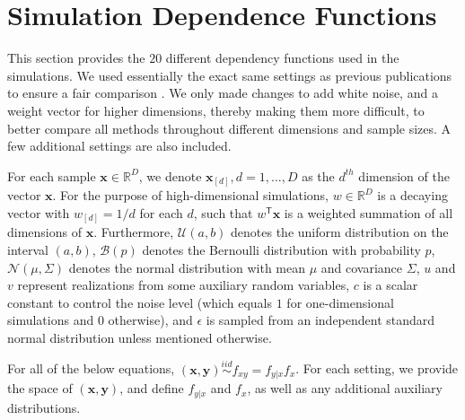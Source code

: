\documentclass[11pt]{article}
\providecommand{\mb}[1]{\boldsymbol{#1}}
\providecommand{\mc}[1]{\mathcal{#1}}
\newcommand{\Real}{\mathbb{R}}
\newcommand{\T}{^{\ensuremath{\mathsf{T}}}}           %
\newcommand{\mbx}{\ensuremath{\mb{x}}}
\begin{document}
\clearpage

\section{Simulation Dependence Functions}
\label{appen:function}

This section provides the $20$ different dependency functions used in the simulations.  We used essentially the exact same settings as previous publications to ensure a fair comparison \cite{SzekelyRizzoBakirov2007, SimonTibshirani2012, SimonTibshirani2012, GorfineHellerHeller2012}.  We only made changes to add white noise, and a weight vector for higher dimensions, thereby making them more difficult, to better compare all methods throughout different dimensions and sample sizes. A few additional settings are also included.

For each sample $\mb{x} \in \Real^{D}$, we denote $\mb{x}_{[d]}, d=1,\ldots,D$ as the $d^{th}$ dimension of the vector \mbx. For the purpose of high-dimensional simulations, $w \in \Real^{D}$ is a decaying vector with $w_{[d]}=1/d$ for each $d$, such that $w\T \mb{x}$ is a 
weighted summation of all dimensions of \mbx. %
Furthermore, $\mc{U}(a,b)$ denotes the uniform distribution on the interval $(a,b)$, $\mc{B}(p)$ denotes the Bernoulli distribution with probability $p$, $\mc{N}(\mu,{\Sigma})$ denotes the normal distribution with mean ${\mu}$ and covariance ${\Sigma}$, 
$u$ and $v$ represent realizations from some auxiliary random variables, $c$ is a scalar constant to control the noise level (which equals $1$ for one-dimensional simulations and $0$ otherwise), and $\epsilon$ is sampled from an independent standard normal distribution unless mentioned otherwise.

For all of the below equations, $(\mb{x},\mb{y}) \overset{iid}{\sim} f_{xy} = f_{y|x} f_x$. For each setting, we provide the space of $(\mb{x},\mb{y})$, and define $f_{y|x}$ and $f_x$, as well as any additional auxiliary distributions.
\end{document}
